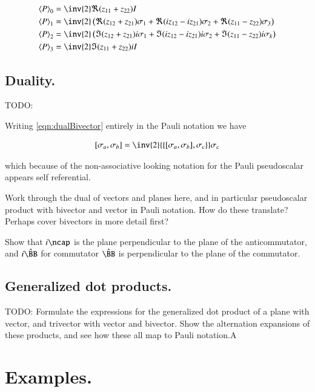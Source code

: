 \documentclass{article}
\newcommand{\symmetric}[2]{{\left\{{#1},{#2}\right\}}}
\newcommand{\antisymmetric}[2]{\left[{#1},{#2}\right]}
\newcommand{\Bcap}[0]{\hat{\BB}}
\begin{document}
\begin{align*}
\gpgradezero{P} &= \inv{2} \Re( z_{11} + z_{22} ) I \\
\gpgradeone{P} &= \inv{2} \left(
\Re( z_{12} + z_{21} ) \sigma_1
+\Re( iz_{12} - iz_{21} ) \sigma_2
+\Re( z_{11} - z_{22} ) \sigma_3
\right) \\
\gpgradetwo{P}
&= \inv{2} \left(
\Im( z_{12} + z_{21} ) i\sigma_1
+\Im( iz_{12} - iz_{21} ) i\sigma_2
+\Im( z_{11} - z_{22} ) i\sigma_k
\right) \\
\gpgradethree{P} &= \inv{2} \Im( z_{11} + z_{22} ) iI 
\end{align*}

\subsection{ Duality. }

TODO: 

Writing \ref{eqn:dualBivector} entirely in the Pauli notation we have

\begin{align*}
\antisymmetric{\sigma_a}{\sigma_b} 
&= \inv{2} \symmetric{\antisymmetric{\sigma_a}{\sigma_b}}{\sigma_c} \sigma_c \\
\end{align*}

which because of the non-associative looking notation for the Pauli pseudoscalar appears self referential.

Work through the dual of vectors and planes here, and in particular 
pseudoscalar product with bivector and vector in Pauli notation.  How do these
translate?  Perhaps cover bivectors in more detail first?

Show that $i \ncap$ is the plane perpendicular to the plane of the anticommutator, and $i \Bcap$ for commutator $\Bcap$ is perpendicular to the plane of the commutator.

\subsection{ Generalized dot products. }

TODO: Formulate the expressions for the generalized dot product of a plane with vector, and trivector with vector and bivector.  Show the alternation expansions of these products, and see how these all map to Pauli notation.A

\section{ Examples. }
\end{document}
